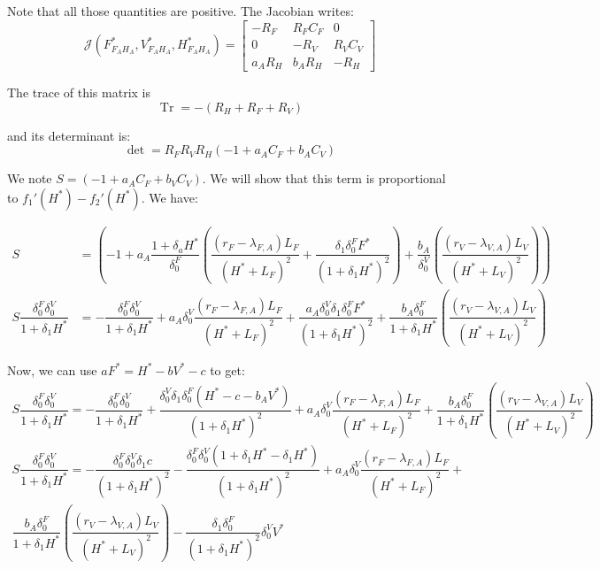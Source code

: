 \documentclass{article}
\newcommand{\lfa}{\lambda_{F, A}}
\newcommand{\lva}{\lambda_{V, A}}
\newcommand{\df}{\delta_0^F}
\newcommand{\dv}{\delta_0^V}
\DeclareMathOperator{\Tr}{Tr}
\begin{document}
Note that all those quantities are positive.
The Jacobian writes:
\begin{equation}
\mathcal{J}(F^*_{F_AH_A}, V^*_{F_AH_A}, H^*_{F_AH_A}) =  \begin{bmatrix}
- R_F & R_F  C_F & 0\\
0 & - R_V & R_V C_V \\
a_A R_H & b_A R_H & -R_H
\end{bmatrix}
\end{equation}

The trace of this matrix is
$$
\Tr = -(R_H + R_F + R_V)
$$

and its determinant is:
$$
\det = R_FR_VR_H \left(-1 + a_A C_F + b_A C_V \right)
$$

We note $S = \left(-1 + a_A C_F + b_V C_V \right)$. We will show that this term is proportional to $f_1'(H^*) - f_2'(H^*)$. We have:

\begin{align*}
S &= \left(-1 + a_A \dfrac{1 + \delta_a H^*}{\df} \left( \dfrac{(r_F - \lfa)L_F}{(H^* + L_F)^2} + \dfrac{\delta_1 \df F^*}{(1 + \delta_1 H^*)^2} \right) + \dfrac{b_A}{\dv} \left( \dfrac{(r_V - \lva)L_V}{(H^* + L_V)^2} \right) \right) \\
S \dfrac{\df \dv}{1 + \delta_1 H^*}  &= -\dfrac{\df \dv}{1 + \delta_1 H^*} + a_A \dv \dfrac{(r_F - \lfa)L_F}{(H^* + L_F)^2} +  \dfrac{a_A \dv \delta_1 \df F^*}{(1 + \delta_1 H^*)^2} + \dfrac{b_A \df}{1 + \delta_1 H^*} \left( \dfrac{(r_V - \lva)L_V}{(H^* + L_V)^2} \right)
\end{align*}

Now, we can use $a F^* = H^* - bV^* - c$ to get:
\begin{multline*}
S \dfrac{\df \dv}{1 + \delta_1 H^*}  = -\dfrac{\df \dv}{1 + \delta_1 H^*}  +  \dfrac{\dv \delta_1 \df (H^*-c-b_AV^*)}{(1 + \delta_1 H^*)^2} +  a_A \dv \dfrac{(r_F - \lfa)L_F}{(H^* + L_F)^2} + \dfrac{b_A \df}{1 + \delta_1 H^*} \left( \dfrac{(r_V - \lva)L_V}{(H^* + L_V)^2} \right)
\end{multline*}
\begin{multline*}
S \dfrac{\df \dv}{1 + \delta_1 H^*}   = -\dfrac{\df \dv \delta_1 c}{(1 + \delta_1 H^*)^2} - \dfrac{\df \dv (1 + \delta_1 H^* - \delta_1 H^*)}{(1 + \delta_1 H^*)^2} + a_A \dv \dfrac{(r_F - \lfa)L_F}{(H^* + L_F)^2} + \\ \dfrac{b_A \df}{1 + \delta_1 H^*} \left( \dfrac{(r_V - \lva)L_V}{(H^* + L_V)^2} \right) -  \dfrac{\delta_1 \df}{(1 + \delta_1 H^*)^2} \dv V^*
\end{multline*}
\end{document}
